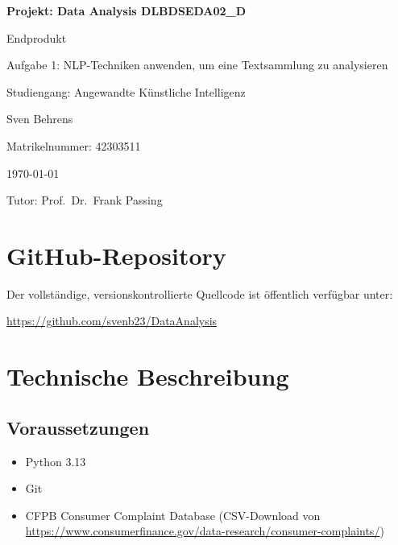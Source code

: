 \documentclass[a4paper,11pt]{article}
\begin{document}
\begin{titlepage}
    \thispagestyle{empty}
    \centering
    \vspace*{5cm}
    {\Huge\bfseries Projekt: Data Analysis DLBDSEDA02\_D \par}
    \vspace{1cm}
    {\Large Endprodukt \par}
    \vspace{0.3cm}
    {\large Aufgabe 1: NLP-Techniken anwenden, um eine Textsammlung zu analysieren \par}
    \vspace{0.5cm}
    {\large Studiengang: Angewandte Künstliche Intelligenz \par}
    \vspace{0.5cm}
    {\large Sven Behrens \par}
    \vspace{0.5cm}
    {\large Matrikelnummer: 42303511 \par}
    \vspace{0.5cm}
    {\large \today \par}
    \vspace{0.5cm}
    {\large Tutor: Prof.~Dr.~Frank Passing \par}
\end{titlepage}

\setcounter{page}{1}

\section{GitHub-Repository}

Der vollständige, versionskontrollierte Quellcode ist öffentlich verfügbar unter:

\url{https://github.com/svenb23/DataAnalysis}

\section{Technische Beschreibung}

\subsection{Voraussetzungen}
\begin{itemize}
    \item Python 3.13
    \item Git
    \item CFPB Consumer Complaint Database (CSV-Download von
          \url{https://www.consumerfinance.gov/data-research/consumer-complaints/})
\end{itemize}
\end{document}
